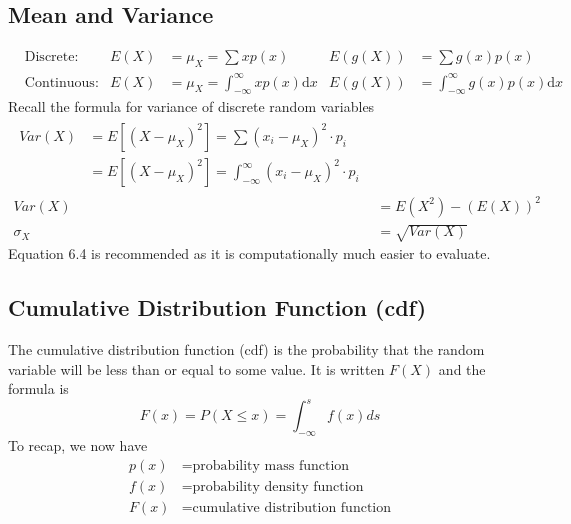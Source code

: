 \subsection{Mean and Variance}  %
\begin{align}
     & \text{Discrete:}   & E(X) & =\mu_X=\sum xp(x)                             & E(g(X)) & =\sum g(x)p(x)                            \\
     & \text{Continuous:} & E(X) & =\mu_X=\int_{-\infty}^{\infty} xp(x)\text{d}x & E(g(X)) & =\int_{-\infty}^{\infty}g(x)p(x)\text{d}x
\end{align}
Recall the formula for variance of discrete random variables
\begin{align}
    \begin{split}
        Var(X) & =E[{(X-\mu_X)}^2]=\sum{(x_i-\mu_X)}^2\cdot p_i                  \\
               & =E[{(X-\mu_X)}^2]=\int_{-\infty}^\infty{(x_i-\mu_X)}^2\cdot p_i
    \end{split} \\
    Var(X)   & =E(X^2)-(E(X))^2                                              \\
    \sigma_X & =\sqrt{Var(X)}
\end{align}
Equation 6.4 is recommended as it is computationally much easier to evaluate.

\subsection{Cumulative Distribution Function (cdf)}  %
The cumulative distribution function (cdf) is the probability that the random variable will be less than or equal to some value. It is written $F(X)$ and the formula is
\begin{equation}
    F(x)=P(X\leq x)=\int_{-\infty}^{s} f(x)ds
\end{equation}
To recap, we now have
\begin{align}
    p(x) & = \text{probability mass function}        \\
    f(x) & = \text{probability density function}     \\
    F(x) & = \text{cumulative distribution function}
\end{align}


